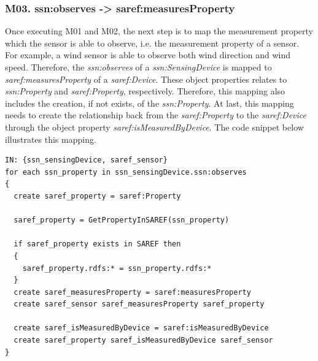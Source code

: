 \documentclass{sig-alternate-05-2015}
\begin{document}
\subsubsection{M03. ssn:\-observes -> saref:\-measuresProperty}
Once executing M01 and M02, the next step is to map the measurement property which the sensor is able to observe, i.e. the measurement property of a sensor. For example, a wind sensor is able to observe both wind direction and wind speed. Therefore, the \textit{ssn:\-observes} of a \textit{ssn:\-SensingDevice} is mapped to \textit{saref:\-measuresProperty} of a \textit{saref:\-Device}. These object properties relates to \textit{ssn:\-Property} and \textit{saref:\-Property}, respectively. Therefore, this mapping also includes the creation, if not exists, of the \textit{ssn:\-Property}. At last, this mapping needs to create the relationship back from the \textit{saref:\-Property} to the \textit{saref:\-Device} through the object property \textit{saref:\-isMeasuredByDevice}. The code snippet below illustrates this mapping. 

\begin{lstlisting}[caption={Pseudocode snippet for M03},label={code:sample}]
IN: {ssn_sensingDevice, saref_sensor}
for each ssn_property in ssn_sensingDevice.ssn:observes 
{ 
  create saref_property = saref:Property 
  
  saref_property = GetPropertyInSAREF(ssn_property)
    
  if saref_property exists in SAREF then 
  { 
    saref_property.rdfs:* = ssn_property.rdfs:* 
  } 
  create saref_measuresProperty = saref:measuresProperty 
  create saref_sensor saref_measuresProperty saref_property 
  
  create saref_isMeasuredByDevice = saref:isMeasuredByDevice
  create saref_property saref_isMeasuredByDevice saref_sensor
}
\end{lstlisting}
\end{document}
